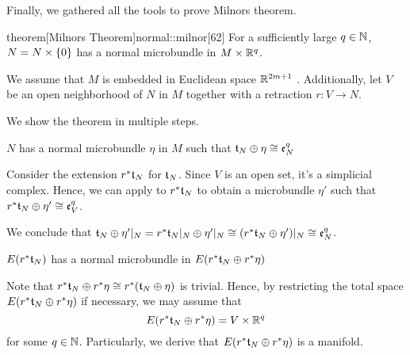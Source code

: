 \begin{scope}
    \newcommand{\rwhitney} {
        \whitney{\ind{r}\bt_N}{\ind{r}\eta}
    }
    \newcommand{\rtn} {
        \ind{r}\bt_N
    }

    \begin{myparagraph}
        Finally, we gathered all the tools to prove Milnors theorem.
    \end{myparagraph}

    \begin{mystatement}{theorem}[Milnors Theorem]{normal::milnor}[62]
        For a sufficiently large $q \in \N$, $N = \cyldown{N}$ has a normal microbundle in $M \cross \R^q$.
    \end{mystatement}

    \begin{myproof}
        We assume that $M$ is embedded in Euclidean space $\R^{2m + 1}$ \cite[p.60]{dimension}.
        Additionally, let $V$ be an open neighborhood of $N$ in $M$ together with a retraction $r: V \to N$.

        We show the theorem in multiple steps.
        \begin{steps}
            \item $N$ has a normal microbundle $\eta$ in $M$ such that $\whitney{\bt_N}{\eta} \cong \be[q]{N}$
            
            Consider the extension $\ind{r}\bt_N$ for $\bt_N$.
            Since $V$ is an open set, it's a simplicial complex.
            Hence, we can apply  to $\ind{r}\bt_N$
            to obtain a microbundle $\eta'$ such that $\whitney{\ind{r}\bt_N}{\eta'} \cong \be[q]{V}$.

            We conclude that $\whitney{\bt_N}{\eta'\restr{N}} = \whitney{\ind{r}\bt_N\restr{N}}{\eta'\restr{N}} \cong (\whitney{\ind{r}\bt_N}{\eta'})\restr{N} \cong \be[q]{N}$.

            \item $E(\rtn)$ has a normal microbundle in $E(\rwhitney)$

            Note that $\rwhitney \cong \ind{r}(\whitney{\bt_N}{\eta})$ is trivial.
            Hence, by restricting the total space $E(\rwhitney)$ if necessary,
            we may assume that
            \[ E(\rwhitney) = V \cross \R^q \]
            for some $q \in \N$.
            Particularly, we derive that $E(\rwhitney)$ is a manifold.


\end{steps}
\end{myproof}
\end{scope}
